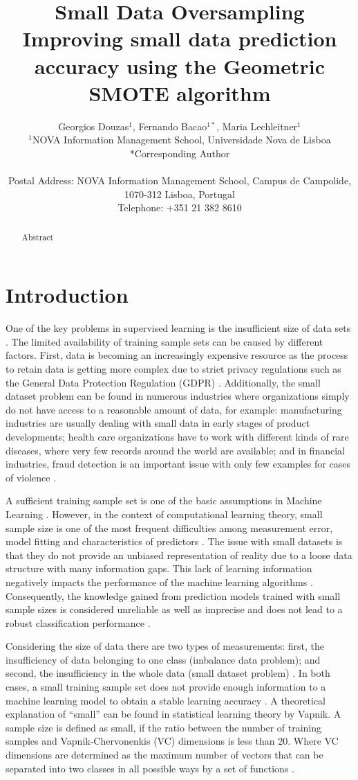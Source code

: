 \documentclass[parskip=full]{scrartcl}
\title{Small Data Oversampling  \\ \LARGE{Improving small data prediction accuracy using the Geometric SMOTE algorithm}}
\author{
	Georgios Douzas\(^{1}\), Fernando Bacao\(^{1*}\), Maria Lechleitner\(^{1}\) 
	\\
	\small{\(^{1}\)NOVA Information Management School, Universidade Nova de Lisboa}
	\\
	\small{*Corresponding Author}
	\\
	\\
	\small{Postal Address: NOVA Information Management School, Campus de Campolide, 1070-312 Lisboa, Portugal}
	\\
	\small{Telephone: +351 21 382 8610}
}
\date{}
\begin{document}
\maketitle

\begin{abstract}
Abstract
\end{abstract}

\section{Introduction}
One of the key problems in supervised learning is the insufficient size of data
sets \cite{Niyogi.1998}. The limited availability of training sample sets can be
caused by different factors. First, data is becoming an increasingly expensive 
resource \cite{Li.2007} as the process to retain data is getting more complex 
due to strict privacy regulations such as the General Data Protection 
Regulation (GDPR) \cite{EuropeanCommission.2019}. Additionally, the small 
dataset problem can be found in numerous industries where organizations simply 
do not have access to a reasonable amount of data, for example: manufacturing 
industries are usually dealing with small data in early stages of product 
developments; health care organizations have to work with different kinds of 
rare diseases, where very few records around the world are available; and in 
financial industries, fraud detection is an important issue with only few 
examples for cases of violence \cite{AbdulLateh.2017}.

A sufficient training sample set is one of the basic assumptions in Machine
Learning \cite{Ivanescu.2006}. However, in the context of computational learning
theory, small sample size is one of the most frequent difficulties among
measurement error, model fitting and characteristics of predictors
\cite{AbdulLateh.2017}. The issue with small datasets is that they do not 
provide an unbiased representation of reality due to a loose data structure 
with many information gaps. This lack of learning information negatively 
impacts the performance of the machine learning algorithms \cite{Lin.2018}. 
Consequently, the knowledge gained from prediction models trained with small 
sample sizes is considered unreliable as well as imprecise and does not lead to 
a robust classification performance \cite{AbdulLateh.2017}.

Considering the size of data there are two types of measurements: first, the 
insufficiency of data belonging to one class (imbalance data problem); and 
second, the insufficiency in the whole data (small dataset problem) 
\cite{Sezer.2014}. In both cases, a small training sample set does not provide 
enough information to a machine learning model to obtain a stable learning 
accuracy \cite{Tsai.2008}. A theoretical explanation of “small” can be found in 
statistical learning theory by Vapnik. A sample size is defined as small, if 
the ratio between the number of training samples and Vapnik-Chervonenkis (VC) 
dimensions is less than 20. Where VC dimensions are determined as the maximum 
number of vectors that can be separated into two classes in all possible ways 
by a set of functions \cite{Vapnik.2008}. 
\end{document}
